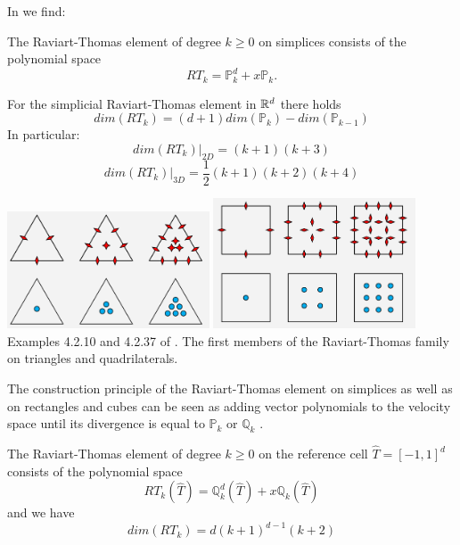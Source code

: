 In \textcite{kanschat17}  we find:
\begin{displayquote}
{\color{darkgray}

The Raviart-Thomas element of degree $k\ge 0$ on
simplices consists of the polynomial space
\[
RT_k = {\mathbb P}_k^d + x {\mathbb P}_k.
\]

For the simplicial Raviart-Thomas element in ${\mathbb{R}}^d$
there holds
\[
dim(RT_k) = (d+1) dim({\mathbb P}_k) - dim({\mathbb P}_{k-1})
\]
In particular:
\[
dim(RT_k)|_{2D} = (k+1)(k+3)
\]
\[
dim(RT_k)|_{3D} = \frac12(k+1)(k+2)(k+4)
\]


\begin{center}
\includegraphics[width=6cm]{images/pair_raviart-thomas/RT_kanschat_T}
\includegraphics[width=6cm]{images/pair_raviart-thomas/RT_kanschat_Q}\\
{\captionfont Examples 4.2.10 and 4.2.37 of \textcite{kanschat17}.
The first members of the Raviart-Thomas family on triangles and quadrilaterals.
}
\end{center}

The construction principle of the Raviart-Thomas element on simplices as well
as on rectangles and cubes can be seen as adding vector polynomials to the
velocity space until its divergence is equal to ${\mathbb P}_k$ or ${\mathbb Q}_k$ .

The Raviart-Thomas element of degree $k\ge 0$
on the reference cell $\hat{T}=[-1,1]^d$ consists of the polynomial space
\[
RT_k(\hat{T}) = {\mathbb Q}_k^d(\hat{T}) + x {\mathbb Q}_k(\hat{T})
\]
and we have
\[
dim(RT_k) = d(k+1)^{d-1}(k+2)
\]

}
\end{displayquote}

